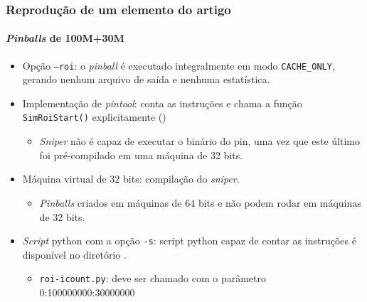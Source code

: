 \documentclass[10pt]{beamer}
\newcommand{\cmark}{\ding{51}}%
\newcommand{\xmark}{\ding{55}}%
\begin{document}
\begin {frame}
\frametitle{Reprodução de um elemento do artigo}
\framesubtitle{\textit{Pinballs} de 100M+30M}
\begin{itemize}
  \item Opção \texttt{--roi}: o \textit{pinball} é
  executado integralmente em modo \texttt{CACHE\_ONLY}, gerando nenhum arquivo de
  saída e nenhuma estatística. \xmark
  \vspace{12pt}
  \item Implementação de \textit{pintool}: conta as instruções e chama a função
  \texttt{SimRoiStart()} explicitamente () \xmark
  \begin{itemize}
    \item \textit{Sniper} não é capaz de executar o binário do pin, uma vez que este
    último foi pré-compilado em uma máquina de 32 bits.
  \end{itemize}
  \vspace{12pt}
  \item Máquina virtual de 32 bits: compilação do \textit{sniper}. \xmark
  \begin{itemize}
    \item \textit{Pinballs} criados em máquinas de 64 bits e não podem rodar em máquinas de 32 bits.
  \end{itemize}
  \vspace{12pt}
  \item \textit{Script} python com a opção \texttt{-s}: script python capaz de
  contar as instruções é disponível no diretório . \cmark
  
  \begin{itemize}
    \item \texttt{roi-icount.py}: deve ser chamado com o parâmetro
    0:100000000:30000000
  \end{itemize}

\end{itemize}

\end{frame}
\end{document}
